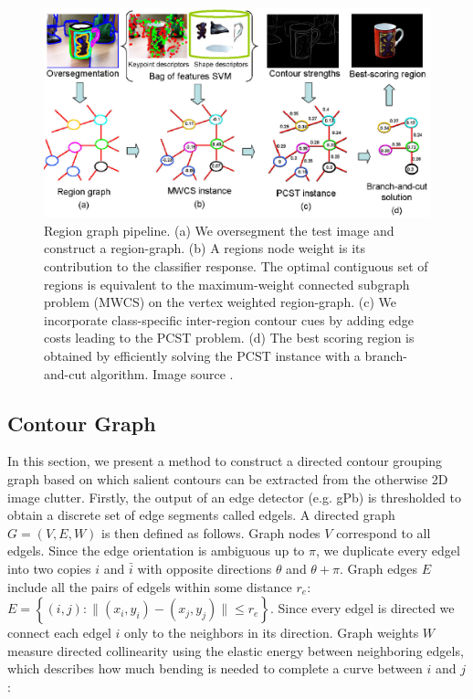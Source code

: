 \documentclass{SMBV13}
\begin{document}
\begin{figure}[htbp]
    \centering
    \includegraphics[width=\textwidth]{Bilder/SMBV13_EMuster_fig12}
    \caption{Region graph pipeline. (a) We oversegment the test image and construct a region-graph. (b) A region\textquotesingle s node weight is its contribution to the classifier response. The optimal contiguous set of regions is equivalent to the maximum-weight connected subgraph problem (MWCS) on the vertex weighted region-graph. (c) We incorporate class-specific inter-region contour cues by adding edge costs leading to the PCST problem. (d) The best scoring region is obtained by efficiently solving the PCST instance with a branch-and-cut algorithm. Image source \cite{VijayGrauman2011}.}
    \label{fig:region_graph}
\end{figure}


\subsection{Contour Graph}

In this section, we present a method to construct a directed contour grouping graph \cite{zhu2007untangling} based on which salient contours can be extracted from the otherwise 2D image clutter. Firstly, the output of an edge detector (e.g. gPb) is thresholded to obtain a discrete set of edge segments called edgels. A directed graph $G = (V,E,W)$ is then defined as follows. Graph nodes $V$ correspond to all edgels. Since the edge orientation is ambiguous up to $\pi$, we duplicate every edgel into two copies $i$ and $\bar{i}$ with opposite directions $\theta$ and $\theta + \pi$. Graph edges $E$ include all the pairs of edgels within some distance $r_e$: $E = \left\lbrace (i, j): \| (x_i, y_i) - (x_j, y_j) \| \leq r_e \right\rbrace$. Since every edgel is directed we connect each edgel $i$ only to the neighbors in its direction. Graph weights $W$ measure directed collinearity using the elastic energy between neighboring edgels, which describes how much bending is needed to complete a curve between $i$ and $j$:
\end{document}
